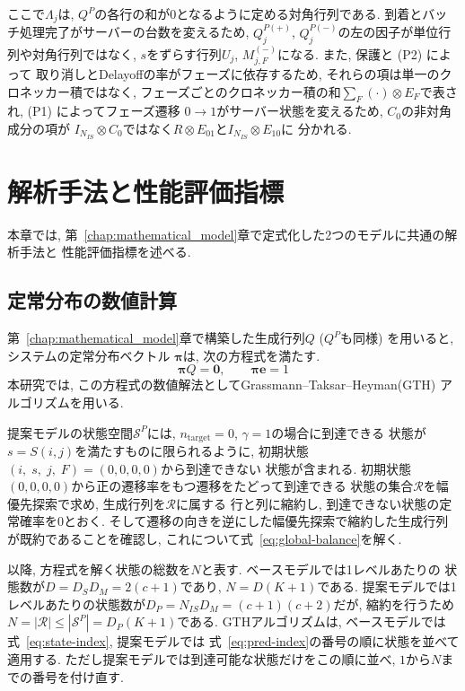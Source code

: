 \documentclass[a4paper, 11pt, dvipdfmx]{jsreport}
\begin{document}
ここで$\Lambda_j$は, $Q^{P}$の各行の和が$0$となるように定める対角行列である. 
到着とバッチ処理完了がサーバーの台数を変えるため, $Q^{P(+)}_j$, $Q^{P(-)}_j$の左の因子が単位行列や対角行列ではなく, $s$をずらす行列$U_j$, $M^{(-)}_{j, F}$になる. また, 保護と (P2) によって
取り消しとDelayoffの率がフェーズに依存するため, それらの項は単一のクロネッカー積ではなく, フェーズごとのクロネッカー積の和$\sum_F (\cdot) \otimes E_F$で表され, (P1) によってフェーズ遷移
$0 \to 1$がサーバー状態を変えるため, $C_0$の非対角成分の項が
$I_{N_{IS}} \otimes C_0$ではなく$R \otimes E_{01}$と$I_{N_{IS}} \otimes E_{10}$に
分かれる. 


 
\chapter{解析手法と性能評価指標}
\label{chap:analysis}

本章では, 第~\ref{chap:mathematical_model}章で定式化した2つのモデルに共通の解析手法と
性能評価指標を述べる. 

\section{定常分布の数値計算}
\label{sec:numerical}
第~\ref{chap:mathematical_model}章で構築した生成行列$Q$ ($Q^{P}$も同様) を用いると, システムの定常分布ベクトル
$\bm{\pi}$は, 次の方程式を満たす. 
\begin{equation}
    \bm{\pi} Q = \bm{0}, \qquad \bm{\pi} \bm{e} = 1
    \label{eq:global-balance}
\end{equation}
本研究では, この方程式の数値解法としてGrassmann--Taksar--Heyman(GTH)
アルゴリズム\cite{GrassmannTaksarHeyman1985}を用いる. 

提案モデルの状態空間$\mathcal{S}^{P}$には, $n_{\mathrm{target}} = 0$, $\gamma = 1$の場合に到達できる
状態が$s = S(i, j)$を満たすものに限られるように, 初期状態$(i, \; s, \; j, \; F)=(0, 0, 0, 0)$から到達できない
状態が含まれる. 
初期状態$(0, 0, 0, 0)$から正の遷移率をもつ遷移をたどって到達できる
状態の集合$\mathcal{R}$を幅優先探索で求め, 生成行列を$\mathcal{R}$に属する
行と列に縮約し, 到達できない状態の定常確率を$0$とおく.
そして遷移の向きを逆にした幅優先探索で縮約した生成行列が既約であることを確認し,
これについて式~\eqref{eq:global-balance}を解く.

以降, 方程式を解く状態の総数を$N$と表す. ベースモデルでは1レベルあたりの
状態数が$D = D_S D_M = 2(c+1)$であり, $N = D(K+1)$である.
提案モデルでは1レベルあたりの状態数が$D_P = N_{IS} D_M = (c+1)(c+2)$だが,
縮約を行うため$N = |\mathcal{R}| \le |\mathcal{S}^{P}| = D_P(K+1)$である. 
GTHアルゴリズムは, ベースモデルでは式~\eqref{eq:state-index}, 提案モデルでは
式~\eqref{eq:pred-index}の番号の順に状態を並べて適用する. ただし提案モデルでは到達可能な状態だけをこの順に並べ, $1$から$N$までの番号を付け直す.
 
\end{document}
